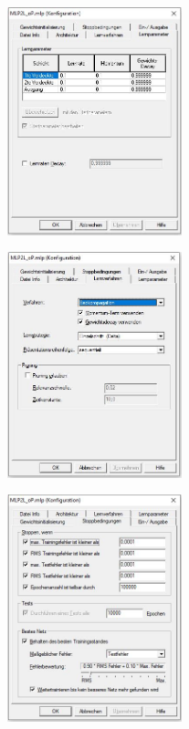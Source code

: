 \documentclass{article}
\begin{document}
\begin{doublespacing}
\begin{appendices}
\begin{figure}[H] 
    \centering
    \includegraphics[width=0.45\textwidth]{Images/Photos/LearnParametersOP.JPG} 
\end{figure}

\begin{figure}[H] 
    \centering
    \includegraphics[width=0.45\textwidth]{Images/Photos/LearnProcessOP.JPG} 
\end{figure}

\begin{figure}[H] 
    \centering
    \includegraphics[width=0.45\textwidth]{Images/Photos/StopConditionsOP.JPG} 
\end{figure}


\end{appendices}
\end{doublespacing}
\end{document}
